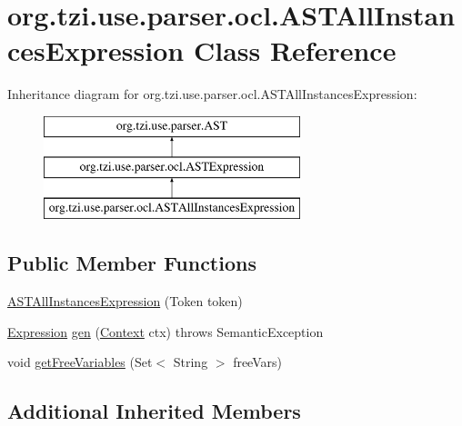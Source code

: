 \hypertarget{classorg_1_1tzi_1_1use_1_1parser_1_1ocl_1_1_a_s_t_all_instances_expression}{\section{org.\-tzi.\-use.\-parser.\-ocl.\-A\-S\-T\-All\-Instances\-Expression Class Reference}
\label{classorg_1_1tzi_1_1use_1_1parser_1_1ocl_1_1_a_s_t_all_instances_expression}
}
Inheritance diagram for org.\-tzi.\-use.\-parser.\-ocl.\-A\-S\-T\-All\-Instances\-Expression\-:\begin{figure}[H]
\begin{center}
\leavevmode
\includegraphics[height=3.000000cm]{classorg_1_1tzi_1_1use_1_1parser_1_1ocl_1_1_a_s_t_all_instances_expression}
\end{center}
\end{figure}
\subsection*{Public Member Functions}
\begin{DoxyCompactItemize}
\item 
\hyperlink{classorg_1_1tzi_1_1use_1_1parser_1_1ocl_1_1_a_s_t_all_instances_expression_af4920d9a8835732995ebf6853aac9a7d}{A\-S\-T\-All\-Instances\-Expression} (Token token)
\item 
\hyperlink{classorg_1_1tzi_1_1use_1_1uml_1_1ocl_1_1expr_1_1_expression}{Expression} \hyperlink{classorg_1_1tzi_1_1use_1_1parser_1_1ocl_1_1_a_s_t_all_instances_expression_a00659e370b8f89ceedf30f6efc5e3b56}{gen} (\hyperlink{classorg_1_1tzi_1_1use_1_1parser_1_1_context}{Context} ctx)  throws Semantic\-Exception 
\item 
void \hyperlink{classorg_1_1tzi_1_1use_1_1parser_1_1ocl_1_1_a_s_t_all_instances_expression_aa93db8b87aa3ec058954d1e8ffeb1210}{get\-Free\-Variables} (Set$<$ String $>$ free\-Vars)
\end{DoxyCompactItemize}
\subsection*{Additional Inherited Members}


